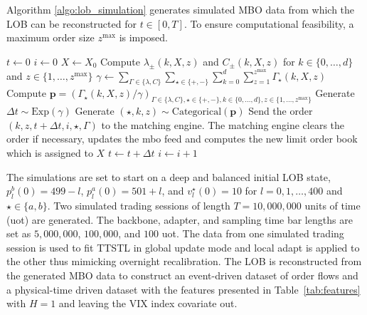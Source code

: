 \documentclass{rQUF2e}
\theoremstyle{plain}
\theoremstyle{definition}
\theoremstyle{remark}
\begin{document}
Algorithm \ref{algo:lob_simulation} generates simulated MBO data from which the LOB can be reconstructed for $t \in [0,T]$. To ensure computational feasibility, a maximum order size $z^{\max}$ is imposed.


\begin{algorithm}[H]
    \caption{Limit Order Book Simulation Algorithm}
    \label{algo:lob_simulation}
    \begin{algorithmic}
        \State $t \gets 0$
        \State $i \gets 0$
        \State $X \gets X_0$
        \State Compute $\lambda_{\pm}(k, X, z)$ and $C_{\pm}(k, X, z)$ for $k \in \{0 , \dots, d \}$ and $z \in \{ 1, \dots, z^{\max} \}$
        \State $\gamma \gets \sum_{\Gamma \in \{ \lambda, C \}} \sum_{\star \in \{+, - \}} \sum^{d}_{k = 0} \sum^{z^{\max}}_{z = 1} \Gamma_{\star}(k, X, z)$
        \State Compute $\mathbf{p} = \left(\Gamma_{\star}(k, X, z) / \gamma\right)_{\Gamma \in \{ \lambda, C \}, \star \in \{+, -\}, k \in \{ 0, \dots, d \}, z \in \{1, \dots, z^{\max} \} }$
        \State Generate $\Delta t \sim \text{Exp}(\gamma)$
        \State Generate $(\star, k, z) \sim \text{Categorical}(\mathbf{p})$
        \State Send the order $(k, z, t + \Delta t, i, \star, \Gamma)$ to the matching engine.
        \State The matching engine clears the order if necessary, updates the mbo feed and computes the new limit order book which is assigned to $X$
        \State $t \gets t + \Delta t$
        \State $i \gets i + 1$
        \EndWhile
    \end{algorithmic}
\end{algorithm}

The simulations are set to start on a deep and balanced initial LOB state, $p^b_l(0) = 499 - l$, $p^a_l(0) = 501 + l$, and $v^\star_l(0) = 10$ for $l = 0, 1, \dots, 400$ and $\star \in \{a, b\}$. Two simulated trading sessions of length $T = 10{,}000{,}000$ units of time (uot) are generated. The backbone, adapter, and sampling time bar lengths are set as $5{,}000{,}000$, $100{,}000$, and $100$ uot. The data from one simulated trading session is used to fit TTSTL in global update mode and local adapt is applied to the other thus mimicking overnight recalibration. The LOB is reconstructed from the generated MBO data to construct an event-driven dataset of order flows and a physical-time driven dataset with the features presented in Table~\ref{tab:features} with $H = 1$ and leaving the VIX index covariate out.
\end{document}
